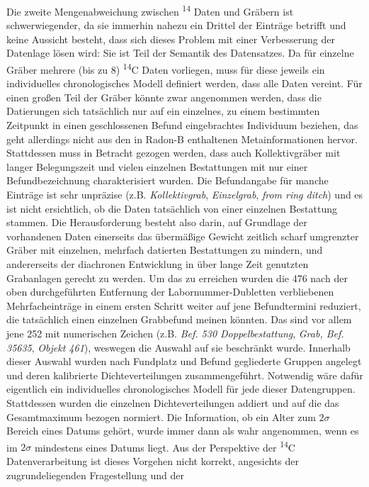 \documentclass[openany,twoside,twocolumn]{book}
\begin{document}
Die zweite Mengenabweichung zwischen \textsuperscript{14} Daten und
Gräbern ist schwerwiegender, da sie immerhin nahezu ein Drittel der
Einträge betrifft und keine Aussicht besteht, dass sich dieses Problem
mit einer Verbesserung der Datenlage lösen wird: Sie ist Teil der
Semantik des Datensatzes. Da für einzelne Gräber mehrere (bis zu 8)
\textsuperscript{14}C Daten vorliegen, muss für diese jeweils ein
individuelles chronologisches Modell definiert werden, dass alle Daten
vereint. Für einen großen Teil der Gräber könnte zwar angenommen werden,
dass die Datierungen sich tatsächlich nur auf ein einzelnes, zu einem
bestimmten Zeitpunkt in einen geschlossenen Befund eingebrachtes
Individuum beziehen, das geht allerdings nicht aus den in Radon-B
enthaltenen Metainformationen hervor. Stattdessen muss in Betracht
gezogen werden, dass auch Kollektivgräber mit langer Belegungszeit und
vielen einzelnen Bestattungen mit nur einer Befundbezeichnung
charakterisiert wurden. Die Befundangabe für manche Einträge ist sehr
unpräzise (z.B. \emph{Kollektivgrab}, \emph{Einzelgrab}, \emph{from ring
ditch}) und es ist nicht ersichtlich, ob die Daten tatsächlich von einer
einzelnen Bestattung stammen. Die Herausforderung besteht also darin,
auf Grundlage der vorhandenen Daten einerseits das übermäßige Gewicht
zeitlich scharf umgrenzter Gräber mit einzelnen, mehrfach datierten
Bestattungen zu mindern, und andererseits der diachronen Entwicklung in
über lange Zeit genutzten Grabanlagen gerecht zu werden. Um das zu
erreichen wurden die 476 nach der oben durchgeführten Entfernung der
Labornummer-Dubletten verbliebenen Mehrfacheinträge in einem ersten
Schritt weiter auf jene Befundtermini reduziert, die tatsächlich einen
einzelnen Grabbefund meinen könnten. Das sind vor allem jene 252 mit
numerischen Zeichen (z.B. \emph{Bef. 530 Doppelbestattung}, \emph{Grab,
Bef. 35635}, \emph{Objekt 461}), weswegen die Auswahl auf sie beschränkt
wurde. Innerhalb dieser Auswahl wurden nach Fundplatz und Befund
gegliederte Gruppen angelegt und deren kalibrierte Dichteverteilungen
zusammengeführt. Notwendig wäre dafür eigentlich ein individuelles
chronologisches Modell für jede dieser Datengruppen. Stattdessen wurden
die einzelnen Dichteverteilungen addiert und auf die das Gesamtmaximum
bezogen normiert. Die Information, ob ein Alter zum \(2\sigma\) Bereich
eines Datums gehört, wurde immer dann als wahr angenommen, wenn es im
\(2\sigma\) mindestens eines Datums liegt. Aus der Perspektive der
\textsuperscript{14}C Datenverarbeitung ist dieses Vorgehen nicht
korrekt, angesichts der zugrundeliegenden Fragestellung und der
\end{document}
